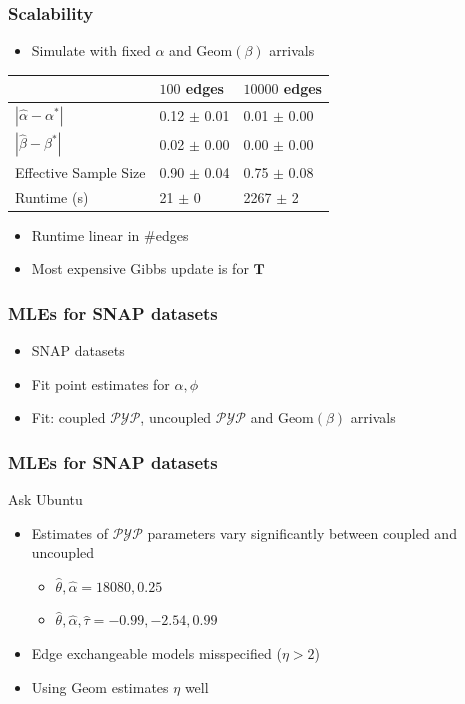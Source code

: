 \documentclass[final,hyperref={pdfpagelabels=false},noamsthm]{beamer}
\def\Geom{\text{Geom}}
\newcommand{\PYP}{\mathcal{PYP}}
\newcommand{\bfT}{\mathbf{T}}
\begin{document}
\begin{frame}
	\frametitle{Scalability}
	\begin{itemize}
		\item Simulate with fixed $\alpha$ and $\Geom(\beta)$ arrivals
	\end{itemize}
	
	\begin{table}[t]
		\label{tab:ess:scale:n}
		\vspace*{-0.25\baselineskip}
		\begin{center}
			\begin{tabular}{l  ll}
				& $100$ edges &  $10000$ edges \\ 
				\hline
				$|\hat{\alpha} - \alpha^*|$ & 0.12 $\pm$ 0.01 &  0.01 $\pm$ 0.00 \\ 
				
				$|\hat{\beta} - \beta^*|$ &  0.02 $\pm$ 0.00  &    0.00 $\pm$ 0.00  \\ 
				
				Effective Sample Size &  0.90 $\pm$ 0.04  &   0.75 $\pm$ 0.08  \\  
				
				Runtime (s) &  21 $\pm$ 0   &  2267 $\pm$ 2  \\ 
				
			\end{tabular}
		\end{center}
	\end{table}
	\begin{itemize}
		\item Runtime linear in \#edges
		\item Most expensive Gibbs update is for $\bfT$
	\end{itemize}
\end{frame}

\begin{frame}
	\frametitle{MLEs for SNAP datasets}
	\begin{itemize}
		\item SNAP datasets
		\item Fit point estimates for $\alpha, \phi$
		\item Fit: coupled $\PYP$, uncoupled $\PYP$ and $\Geom(\beta)$ arrivals
	\end{itemize}
\end{frame}

\begin{frame}
	\frametitle{MLEs for SNAP datasets}
	Ask Ubuntu
	\begin{itemize}
		\item Estimates of $\PYP$ parameters vary significantly between coupled and uncoupled
		\begin{itemize}
			\item $\hat{\theta}, \hat{\alpha} = 18080, 0.25$
			\item $\hat{\theta}, \hat{\alpha}, \hat{\tau} = -0.99, -2.54, 0.99$
		\end{itemize}
		\item Edge exchangeable models misspecified ($\eta > 2$)
		\item Using $\Geom$ estimates $\eta$ well
	\end{itemize}
\end{frame}
	
\end{document}
